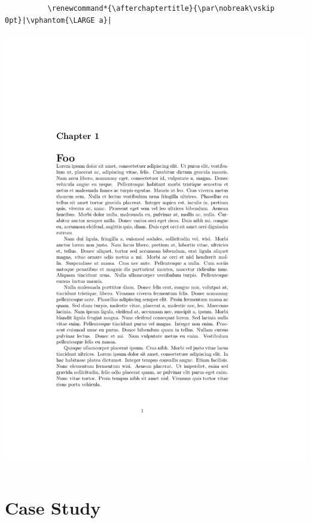 \documentclass{beamer}
\begin{document}
\begin{frame}[fragile]
\begin{overprint}
\begin{columns}
      \begin{column}{0.5\textwidth}
        \begin{verbatim}
          \renewcommand*{\afterchaptertitle}{\par\nobreak\vskip 0pt}|\vphantom{\LARGE a}|
        \end{verbatim}
        \begin{center}
          \includegraphics[frame,page=1,width=0.8\linewidth]{examples/afterchaptertitle-3}
        \end{center}
      \end{column}
    \end{columns}
  \end{overprint}
\end{frame}


\section{Case Study}
\end{document}
